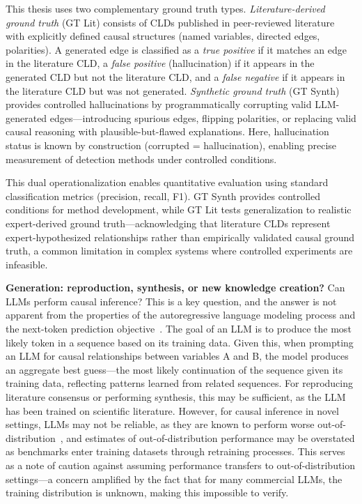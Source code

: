 This thesis uses two complementary ground truth types. \emph{Literature-derived ground truth} (GT Lit) consists of CLDs published in peer-reviewed literature with explicitly defined causal structures (named variables, directed edges, polarities). A generated edge is classified as a \emph{true positive} if it matches an edge in the literature CLD, a \emph{false positive} (hallucination) if it appears in the generated CLD but not the literature CLD, and a \emph{false negative} if it appears in the literature CLD but was not generated. \emph{Synthetic ground truth} (GT Synth) provides controlled hallucinations by programmatically corrupting valid LLM-generated edges---introducing spurious edges, flipping polarities, or replacing valid causal reasoning with plausible-but-flawed explanations. Here, hallucination status is known by construction (corrupted = hallucination), enabling precise measurement of detection methods under controlled conditions.

This dual operationalization enables quantitative evaluation using standard classification metrics (precision, recall, F1). GT Synth provides controlled conditions for method development, while GT Lit tests generalization to realistic expert-derived ground truth---acknowledging that literature CLDs represent expert-hypothesized relationships rather than empirically validated causal ground truth, a common limitation in complex systems where controlled experiments are infeasible.

\medskip
\noindent
\textbf{Generation: reproduction, synthesis, or new knowledge creation?} Can LLMs perform causal inference? This is a key question, and the answer is not apparent from the properties of the autoregressive language modeling process and the next-token prediction objective~\citep{zecevic2023causalparrots}. The goal of an LLM is to produce the most likely token in a sequence based on its training data. Given this, when prompting an LLM for causal relationships between variables A and B, the model produces an aggregate best guess---the most likely continuation of the sequence given its training data, reflecting patterns learned from related sequences. For reproducing literature consensus or performing synthesis, this may be sufficient, as the LLM has been trained on scientific literature. However, for causal inference in novel settings, LLMs may not be reliable, as they are known to perform worse out-of-distribution~\citep{jin2023cladder, joshi2024causalfallacies}, and estimates of out-of-distribution performance may be overstated as benchmarks enter training datasets through retraining processes. This serves as a note of caution against assuming performance transfers to out-of-distribution settings---a concern amplified by the fact that for many commercial LLMs, the training distribution is unknown, making this impossible to verify.

